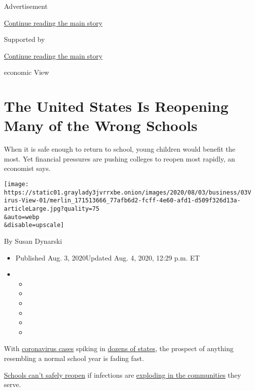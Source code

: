 Advertisement

\protect\hyperlink{after-top}{Continue reading the main story}

Supported by

\protect\hyperlink{after-sponsor}{Continue reading the main story}

economic View

\hypertarget{the-united-states-is-reopening-many-of-the-wrong-schools}{%
\section{The United States Is Reopening Many of the Wrong
Schools}\label{the-united-states-is-reopening-many-of-the-wrong-schools}}

When it is safe enough to return to school, young children would benefit
the most. Yet financial pressures are pushing colleges to reopen most
rapidly, an economist says.

\texttt{[image: https://static01.graylady3jvrrxbe.onion/images/2020/08/03/business/03Virus-View-01/merlin\_171513666\_77afb6d2-fcff-4e60-afd1-d509f326d13a-articleLarge.jpg?quality=75\\\&auto=webp\\\&disable=upscale]}

By Susan Dynarski

\begin{itemize}
\item
  Published Aug. 3, 2020Updated Aug. 4, 2020, 12:29 p.m. ET
\item
  \begin{itemize}
  \item
  \item
  \item
  \item
  \item
  \item
  \end{itemize}
\end{itemize}

With
\href{https://www.nytimes3xbfgragh.onion/news-event/coronavirus}{coronavirus
cases} spiking in
\href{https://www.nytimes3xbfgragh.onion/interactive/2020/07/09/us/coronavirus-cases-reopening-trends.html}{dozens
of states}, the prospect of anything resembling a normal school year is
fading fast.

\href{https://www.nytimes3xbfgragh.onion/2020/08/03/us/school-closing-coronavirus.html}{Schools
can't safely reopen} if infections are
\href{https://www.nytimes3xbfgragh.onion/interactive/2020/07/31/us/coronavirus-school-reopening-risk.html}{exploding
in the communities} they serve.

